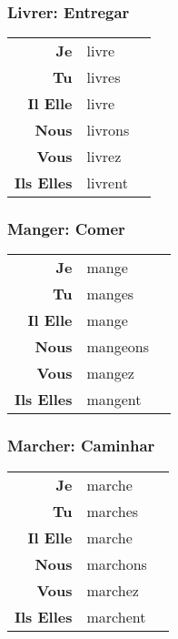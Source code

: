 \documentclass{subfiles}
\begin{document}
\begin{multicols*}{3}
        \subsubsection{Livrer: Entregar}
            \begin{tabular}{r l r}
                \textbf{Je}        & livre   &\\
                \textbf{Tu}        & livres  &\\
                \textbf{Il Elle}   & livre   &\\
                \textbf{Nous}      & livrons &\\
                \textbf{Vous}      & livrez  &\\
                \textbf{Ils Elles} & livrent &
            \end{tabular}

        \subsubsection{Manger: Comer}
            \begin{tabular}{r l r}
                \textbf{Je}        & mange    &\\
                \textbf{Tu}        & manges   &\\
                \textbf{Il Elle}   & mange    &\\
                \textbf{Nous}      & mangeons &\\
                \textbf{Vous}      & mangez   &\\
                \textbf{Ils Elles} & mangent  &
            \end{tabular}

        \subsubsection{Marcher: Caminhar}
            \begin{tabular}{r l r}
                \textbf{Je}        & marche   &\\
                \textbf{Tu}        & marches  &\\
                \textbf{Il Elle}   & marche   &\\
                \textbf{Nous}      & marchons &\\
                \textbf{Vous}      & marchez  &\\
                \textbf{Ils Elles} & marchent &
            \end{tabular}


\end{multicols*}
\end{document}
